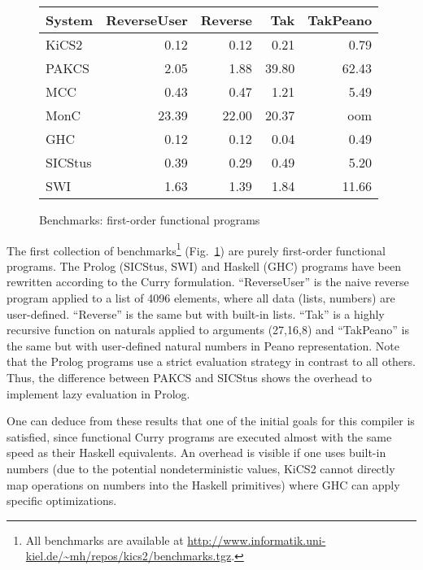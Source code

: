 \documentclass{llncs}
\begin{document}
\begin{figure}
\centering
\begin{tabular}{|@{~~}l@{~~}|*{4}{@{~~}r@{~~}|}}
\hline
System  & ReverseUser & Reverse &  Tak  & TakPeano \\\hline
KiCS2   &      0.12   &   0.12  &  0.21 &    0.79  \\
PAKCS   &      2.05   &   1.88  & 39.80 &   62.43  \\
MCC     &      0.43   &   0.47  &  1.21 &    5.49  \\
MonC    &     23.39   &  22.00  & 20.37 &     oom  \\
GHC     &      0.12   &   0.12  &  0.04 &    0.49  \\
SICStus &      0.39   &   0.29  &  0.49 &    5.20  \\
SWI     &      1.63   &   1.39  &  1.84 &   11.66  \\
\hline
\end{tabular}
\caption{Benchmarks: first-order functional programs}
 \label{fig:bench-first-order}
\end{figure}
%
The first collection of benchmarks\footnote{All benchmarks are available
at \url{http://www.informatik.uni-kiel.de/~mh/repos/kics2/benchmarks.tgz}.}
(Fig.~\ref{fig:bench-first-order})
are purely first-order functional programs.
The Prolog (SICStus, SWI) and Haskell (GHC) programs have been rewritten
according to the Curry formulation.
``ReverseUser'' is the naive reverse program applied to a list of 4096 elements,
where all data (lists, numbers) are user-defined.
``Reverse'' is the same but with built-in lists.
``Tak'' is a highly recursive function on naturals \cite{Partain93}
applied to arguments (27,16,8) and ``TakPeano'' is the same but with
user-defined natural numbers in Peano representation.
Note that the Prolog programs use a strict evaluation strategy
in contrast to all others. Thus, the difference between PAKCS and SICStus
shows the overhead to implement lazy evaluation in Prolog.

One can deduce from these results that one of the initial
goals for this compiler is satisfied, since functional Curry programs
are executed almost with the same speed as their Haskell equivalents.
An overhead is visible if one uses built-in numbers
(due to the potential nondeterministic values, KiCS2 cannot
directly map operations on numbers into the Haskell primitives)
where GHC can apply specific optimizations.
\end{document}
